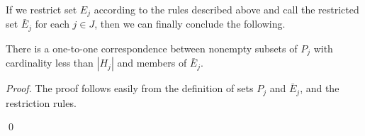 If we restrict set $E_j$ according to the rules described above and call the
restricted set $\bar{E}_j$ for each $j \in J$, then we can finally
conclude the following.
\begin{prop}
\label{dw-prop-p1}
There is a one-to-one correspondence between nonempty subsets of $P_j$ with
cardinality less than $|H_j|$ and members of $\bar{E}_j$.
\end{prop}
\begin{proof}
  The proof follows easily from the definition of sets $P_j$ and $\bar{E}_j$,
  and the restriction rules. 

  \qed 
\end{proof}

